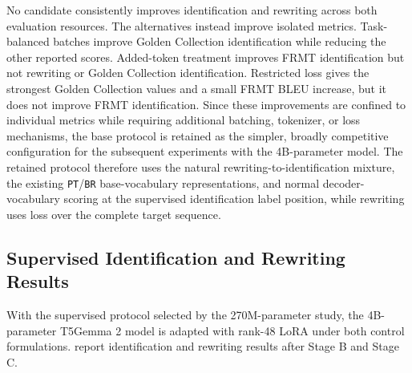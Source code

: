 \documentclass[acmtog,nonacm]{acmart}
\begin{document}
No candidate consistently improves identification and rewriting across both
evaluation resources. The alternatives instead improve isolated metrics.
Task-balanced batches improve Golden Collection identification while reducing
the other reported scores. Added-token treatment improves FRMT identification
but not rewriting or Golden Collection identification. Restricted loss gives
the strongest Golden Collection values and a small FRMT BLEU increase, but it
does not improve FRMT identification. Since these improvements are confined to individual metrics while requiring
additional batching, tokenizer, or loss mechanisms, the base protocol is
retained as the simpler, broadly competitive configuration for the subsequent
experiments with the 4B-parameter model. The retained protocol therefore uses the
natural rewriting-to-identification mixture, the existing \texttt{PT}/\texttt{BR}
base-vocabulary representations, and normal decoder-vocabulary scoring at the
supervised identification label position, while rewriting uses loss over the
complete target sequence.

\subsection{Supervised Identification and Rewriting Results}
\label{sec:main-supervised-results}

With the supervised protocol selected by the 270M-parameter study, the
4B-parameter T5Gemma 2 model is adapted with rank-48 LoRA under both control
formulations. 
report identification and rewriting results after Stage B and Stage C.
\end{document}
